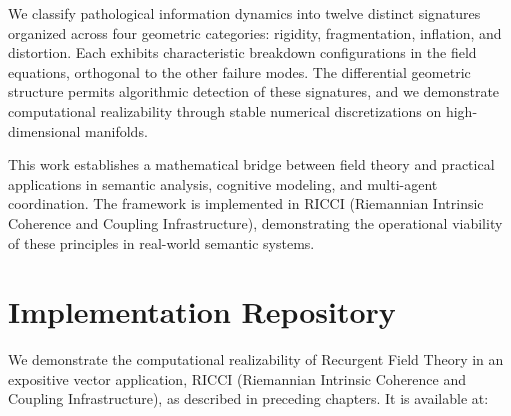 \documentclass[11pt, a4paper]{report}
\begin{document}
We classify pathological information dynamics into twelve distinct signatures organized across four geometric categories: rigidity, fragmentation, inflation, and distortion. Each exhibits characteristic breakdown configurations in the field equations, orthogonal to the other failure modes. The differential geometric structure permits algorithmic detection of these signatures, and we demonstrate computational realizability through stable numerical discretizations on high-dimensional manifolds.

This work establishes a mathematical bridge between field theory and practical applications in semantic analysis, cognitive modeling, and multi-agent coordination. The framework is implemented in RICCI (Riemannian Intrinsic Coherence and Coupling Infrastructure), demonstrating the operational viability of these principles in real-world semantic systems.

\tableofcontents


















\appendix
\chapter{Implementation Repository}
\label{appendix:implementation}

We demonstrate the computational realizability of Recurgent Field Theory in an expositive vector application, RICCI (Riemannian Intrinsic Coherence and Coupling Infrastructure), as described in preceding chapters. It is available at:
\end{document}
